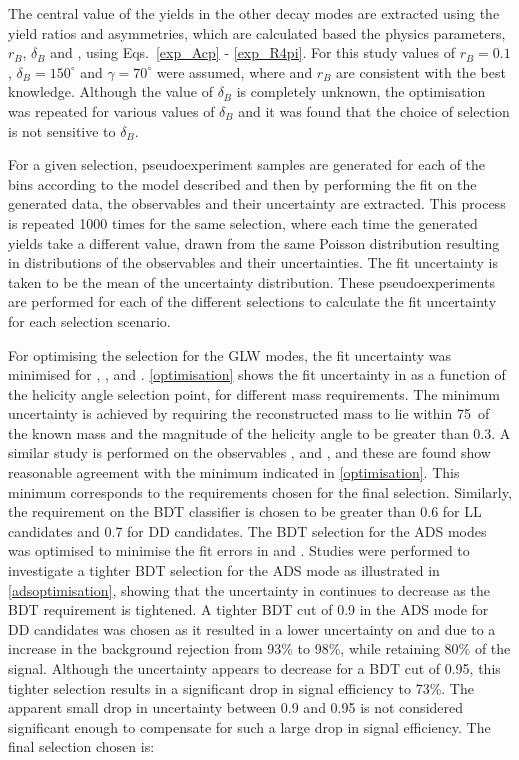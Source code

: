 The central value of the yields in the other \Dz decay modes are extracted using the yield ratios and asymmetries, which are calculated based the physics parameters, $r_B$, $\delta_B$ and \Pgamma, using Eqs.~\ref{exp_Acp} - \ref{exp_R4pi}. For this study values of $r_B = 0.1$, $\delta_B = 150^{\circ}$ and $\gamma = 70^{\circ}$ were assumed, where \Pgamma and $r_B$ are consistent with the best knowledge. Although the value of $\delta_B$ is completely unknown, the optimisation was repeated for various values of $\delta_B$ and it was found that the choice of selection is not sensitive to $\delta_B$. 

For a given selection, pseudoexperiment samples are generated for each of the bins according to the model described and then by performing the \CP fit on the generated data, the \CP observables and their uncertainty are extracted. This process is repeated 1000 times for the same selection, where each time the generated yields take a different value, drawn from the same Poisson distribution resulting in distributions of the \CP observables and their uncertainties. The fit uncertainty is taken to be the mean of the uncertainty distribution. These pseudoexperiments are performed for each of the different selections to calculate the fit uncertainty for each selection scenario.  

For optimising the selection for the GLW modes, the fit uncertainty was minimised for \Akk, \Rkk, \Apipi and \Rpipi. \Fig\ref{optimisation} shows the fit uncertainty in \Rkk as a function of the \KS helicity angle selection point, for different \Kstarm mass requirements. The minimum uncertainty is achieved by requiring the reconstructed \Kstarm mass to lie within 75~\mevcc of the known \Kstarm mass and the magnitude of the \KS helicity angle to be greater than 0.3. A similar study is performed on the \CP observables \Akk, \Apipi and \Rpipi, and these are found show reasonable agreement with the minimum indicated in \fig\ref{optimisation}. This minimum corresponds to the \Kstarm requirements chosen for the final selection. Similarly, the requirement on the BDT classifier is chosen to be greater than 0.6 for LL candidates and 0.7 for DD candidates. The BDT selection for the ADS modes was optimised to minimise the fit errors in \Rptwo and \Rmtwo. Studies were performed to investigate a tighter BDT selection for the ADS mode as illustrated in \fig\ref{adsoptimisation}, showing that the uncertainty in \Rptwo continues to decrease as the BDT requirement is tightened. A tighter BDT cut of 0.9 in the ADS mode for DD candidates was chosen as it resulted in a lower uncertainty on \Rptwo and \Rmtwo due to a increase in the background rejection from 93\% to 98\%, while retaining 80\% of the signal. Although the uncertainty appears to decrease for a BDT cut of 0.95, this tighter selection results in a significant drop in signal efficiency to 73\%. The apparent small drop in uncertainty between 0.9 and 0.95 is not considered significant enough to compensate for such a large drop in signal efficiency. The final selection chosen is:

